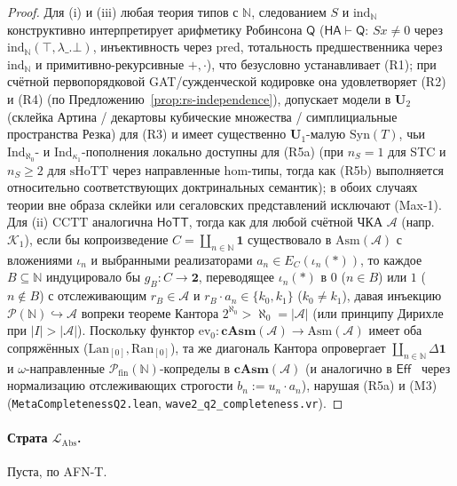 \documentclass[11pt]{article}
\theoremstyle{plain}
\theoremstyle{definition}
\newcommand{\LAbs}{\mathcal{L}_{\mathrm{Abs}}}
\newcommand{\Syn}{\mathrm{Syn}}
\newcommand{\HoTT}{\mathsf{HoTT}}
\newcommand{\Eff}{\ensuremath{\mathsf{Eff}}}
\begin{document}
\begin{proof}
Для (i) и (iii) любая теория типов с $\mathbb{N}$, следованием $S$ и $\mathrm{ind}_{\mathbb{N}}$ конструктивно интерпретирует арифметику Робинсона $\mathsf{Q}$ ($\mathsf{HA} \vdash \mathsf{Q}$: $Sx \neq 0$ через $\mathrm{ind}_{\mathbb{N}}(\top, \lambda\_.\bot)$, инъективность через $\mathrm{pred}$, тотальность предшественника через $\mathrm{ind}_{\mathbb{N}}$ и примитивно-рекурсивные $+, \cdot$), что безусловно устанавливает (R1); при счётной первопорядковой GAT/сужденческой кодировке она удовлетворяет (R2) и (R4) (по Предложению~\ref{prop:rs-independence}), допускает модели в $\mathbf{U}_2$ (склейка Артина / декартовы кубические множества / симплициальные пространства Резка) для (R3) и имеет существенно $\mathbf{U}_1$-малую $\Syn(T)$, чьи $\mathrm{Ind}_{\aleph_0}$- и $\mathrm{Ind}_{\kappa_1}$-пополнения локально доступны для (R5a) (при $n_S = 1$ для STC и $n_S \ge 2$ для $\mathrm{sHoTT}$ через направленные hom-типы, тогда как (R5b) выполняется относительно соответствующих доктринальных семантик); в обоих случаях теории вне образа склейки или сегаловских представлений исключают (Max-1). Для (ii) $\mathrm{CCTT}$ аналогична $\HoTT$, тогда как для любой счётной ЧКА $\mathcal{A}$ (напр.\ $\mathcal{K}_1$), если бы копроизведение $C = \coprod_{n \in \mathbb{N}} \mathbf{1}$ существовало в $\mathrm{Asm}(\mathcal{A})$ с вложениями $\iota_n$ и выбранными реализаторами $a_n \in E_C(\iota_n(*))$, то каждое $B \subseteq \mathbb{N}$ индуцировало бы $g_B : C \to \mathbf{2}$, переводящее $\iota_n(*)$ в $0$ ($n \in B$) или $1$ ($n \notin B$) с отслеживающим $r_B \in \mathcal{A}$ и $r_B \cdot a_n \in \{k_0, k_1\}$ ($k_0 \neq k_1$), давая инъекцию $\mathcal{P}(\mathbb{N}) \hookrightarrow \mathcal{A}$ вопреки теореме Кантора $2^{\aleph_0} > \aleph_0 = |\mathcal{A}|$ (или принципу Дирихле при $|I| > |\mathcal{A}|$). Поскольку функтор $\mathrm{ev}_0 : \mathbf{cAsm}(\mathcal{A}) \to \mathrm{Asm}(\mathcal{A})$ имеет оба сопряжённых ($\mathrm{Lan}_{[0]}, \mathrm{Ran}_{[0]}$), та же диагональ Кантора опровергает $\coprod_{n \in \mathbb{N}}\Delta\mathbf{1}$ и $\omega$-направленные $\mathcal{P}_{\mathrm{fin}}(\mathbb{N})$-копределы в $\mathbf{cAsm}(\mathcal{A})$ (и аналогично в $\Eff$~\cite{Hyland1982} через нормализацию отслеживающих строгости $b_n := u_n \cdot a_n$), нарушая (R5a) и (M3) (\texttt{MetaCompletenessQ2.lean}, \texttt{wave2\_q2\_completeness.vr}).
\end{proof}

\paragraph{Страта $\LAbs$.} Пуста, по AFN-T.
\end{document}
